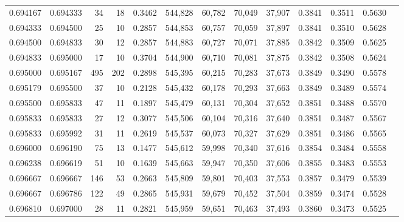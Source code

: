 \begin{tabular}{rrrrrrrrrrrrr}
0.694167 & 0.694333 &    34 &  18 &                                     0.3462 & 544,828 &  60,782 &  70,049 &  37,907 & 0.3841 & 0.3511 & 0.5630 \\
0.694333 & 0.694500 &    25 &  10 &                                     0.2857 & 544,853 &  60,757 &  70,059 &  37,897 & 0.3841 & 0.3510 & 0.5628 \\
0.694500 & 0.694833 &    30 &  12 &                                     0.2857 & 544,883 &  60,727 &  70,071 &  37,885 & 0.3842 & 0.3509 & 0.5625 \\
0.694833 & 0.695000 &    17 &  10 &                                     0.3704 & 544,900 &  60,710 &  70,081 &  37,875 & 0.3842 & 0.3508 & 0.5624 \\
0.695000 & 0.695167 &   495 & 202 &                                     0.2898 & 545,395 &  60,215 &  70,283 &  37,673 & 0.3849 & 0.3490 & 0.5578 \\
0.695179 & 0.695500 &    37 &  10 &                                     0.2128 & 545,432 &  60,178 &  70,293 &  37,663 & 0.3849 & 0.3489 & 0.5574 \\
0.695500 & 0.695833 &    47 &  11 &                                     0.1897 & 545,479 &  60,131 &  70,304 &  37,652 & 0.3851 & 0.3488 & 0.5570 \\
0.695833 & 0.695833 &    27 &  12 &                                     0.3077 & 545,506 &  60,104 &  70,316 &  37,640 & 0.3851 & 0.3487 & 0.5567 \\
0.695833 & 0.695992 &    31 &  11 &                                     0.2619 & 545,537 &  60,073 &  70,327 &  37,629 & 0.3851 & 0.3486 & 0.5565 \\
0.696000 & 0.696190 &    75 &  13 &                                     0.1477 & 545,612 &  59,998 &  70,340 &  37,616 & 0.3854 & 0.3484 & 0.5558 \\
0.696238 & 0.696619 &    51 &  10 &                                     0.1639 & 545,663 &  59,947 &  70,350 &  37,606 & 0.3855 & 0.3483 & 0.5553 \\
0.696667 & 0.696667 &   146 &  53 &                                     0.2663 & 545,809 &  59,801 &  70,403 &  37,553 & 0.3857 & 0.3479 & 0.5539 \\
0.696667 & 0.696786 &   122 &  49 &                                     0.2865 & 545,931 &  59,679 &  70,452 &  37,504 & 0.3859 & 0.3474 & 0.5528 \\
0.696810 & 0.697000 &    28 &  11 &                                     0.2821 & 545,959 &  59,651 &  70,463 &  37,493 & 0.3860 & 0.3473 & 0.5525 \\

\end{tabular}
